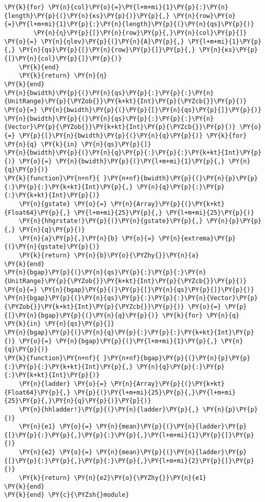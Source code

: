 \begin{Verbatim}[commandchars=\\\{\}]
    \PY{k}{for} \PY{n}{col}\PY{o}{=}\PY{l+m+mi}{1}\PY{p}{:}\PY{n}{length}\PY{p}{(}\PY{n}{κs}\PY{p}{)}\PY{p}{,} \PY{n}{row}\PY{o}{=}\PY{l+m+mi}{1}\PY{p}{:}\PY{n}{length}\PY{p}{(}\PY{n}{qs}\PY{p}{)}
        \PY{n}{η}\PY{p}{[}\PY{n}{row}\PY{p}{,}\PY{n}{col}\PY{p}{]} \PY{o}{=} \PY{n}{ηlev}\PY{p}{(}\PY{n}{A}\PY{p}{,} \PY{l+m+mi}{1}\PY{p}{,} \PY{n}{qs}\PY{p}{[}\PY{n}{row}\PY{p}{]}\PY{p}{,} \PY{n}{κs}\PY{p}{[}\PY{n}{col}\PY{p}{]}\PY{p}{)}
    \PY{k}{end}
    \PY{k}{return} \PY{n}{η}
\PY{k}{end}
\PY{n}{bwidth}\PY{p}{(}\PY{n}{qs}\PY{p}{:}\PY{p}{:}\PY{n}{UnitRange}\PY{p}{\PYZob{}}\PY{k+kt}{Int}\PY{p}{\PYZcb{}}\PY{p}{)} \PY{o}{=} \PY{n}{bwidth}\PY{p}{(}\PY{p}{[}\PY{n}{qs}\PY{p}{]}\PY{p}{)}
\PY{n}{bwidth}\PY{p}{(}\PY{n}{qs}\PY{p}{:}\PY{p}{:}\PY{n}{Vector}\PY{p}{\PYZob{}}\PY{k+kt}{Int}\PY{p}{\PYZcb{}}\PY{p}{)} \PY{o}{=} \PY{p}{[}\PY{n}{bwidth}\PY{p}{(}\PY{n}{q}\PY{p}{)} \PY{k}{for} \PY{n}{q} \PY{k}{in} \PY{n}{qs}\PY{p}{]}
\PY{n}{bwidth}\PY{p}{(}\PY{n}{q}\PY{p}{:}\PY{p}{:}\PY{k+kt}{Int}\PY{p}{)} \PY{o}{=} \PY{n}{bwidth}\PY{p}{(}\PY{l+m+mi}{1}\PY{p}{,} \PY{n}{q}\PY{p}{)}
\PY{k}{function}\PY{n+nf}{ }\PY{n+nf}{bwidth}\PY{p}{(}\PY{n}{p}\PY{p}{:}\PY{p}{:}\PY{k+kt}{Int}\PY{p}{,} \PY{n}{q}\PY{p}{:}\PY{p}{:}\PY{k+kt}{Int}\PY{p}{)}
    \PY{n}{gstate} \PY{o}{=} \PY{n}{Array}\PY{p}{(}\PY{k+kt}{Float64}\PY{p}{,} \PY{l+m+mi}{25}\PY{p}{,} \PY{l+m+mi}{25}\PY{p}{)}
    \PY{n}{hhgrstate!}\PY{p}{(}\PY{n}{gstate}\PY{p}{,} \PY{n}{p}\PY{p}{,} \PY{n}{q}\PY{p}{)}
    \PY{n}{a}\PY{p}{,}\PY{n}{b} \PY{o}{=} \PY{n}{extrema}\PY{p}{(}\PY{n}{gstate}\PY{p}{)}
    \PY{k}{return} \PY{n}{b}\PY{o}{\PYZhy{}}\PY{n}{a}
\PY{k}{end}
\PY{n}{bgap}\PY{p}{(}\PY{n}{qs}\PY{p}{:}\PY{p}{:}\PY{n}{UnitRange}\PY{p}{\PYZob{}}\PY{k+kt}{Int}\PY{p}{\PYZcb{}}\PY{p}{)} \PY{o}{=} \PY{n}{bgap}\PY{p}{(}\PY{p}{[}\PY{n}{qs}\PY{p}{]}\PY{p}{)}
\PY{n}{bgap}\PY{p}{(}\PY{n}{qs}\PY{p}{:}\PY{p}{:}\PY{n}{Vector}\PY{p}{\PYZob{}}\PY{k+kt}{Int}\PY{p}{\PYZcb{}}\PY{p}{)} \PY{o}{=} \PY{p}{[}\PY{n}{bgap}\PY{p}{(}\PY{n}{q}\PY{p}{)} \PY{k}{for} \PY{n}{q} \PY{k}{in} \PY{n}{qs}\PY{p}{]}
\PY{n}{bgap}\PY{p}{(}\PY{n}{q}\PY{p}{:}\PY{p}{:}\PY{k+kt}{Int}\PY{p}{)} \PY{o}{=} \PY{n}{bgap}\PY{p}{(}\PY{l+m+mi}{1}\PY{p}{,} \PY{n}{q}\PY{p}{)}
\PY{k}{function}\PY{n+nf}{ }\PY{n+nf}{bgap}\PY{p}{(}\PY{n}{p}\PY{p}{:}\PY{p}{:}\PY{k+kt}{Int}\PY{p}{,} \PY{n}{q}\PY{p}{:}\PY{p}{:}\PY{k+kt}{Int}\PY{p}{)}
    \PY{n}{ladder} \PY{o}{=} \PY{n}{Array}\PY{p}{(}\PY{k+kt}{Float64}\PY{p}{,} \PY{p}{(}\PY{l+m+mi}{25}\PY{p}{,}\PY{l+m+mi}{25}\PY{p}{,}\PY{n}{q}\PY{p}{)}\PY{p}{)}
    \PY{n}{hhladder!}\PY{p}{(}\PY{n}{ladder}\PY{p}{,} \PY{n}{p}\PY{p}{)}
    \PY{n}{e1} \PY{o}{=} \PY{n}{mean}\PY{p}{(}\PY{n}{ladder}\PY{p}{[}\PY{p}{:}\PY{p}{,}\PY{p}{:}\PY{p}{,}\PY{l+m+mi}{1}\PY{p}{]}\PY{p}{)}
    \PY{n}{e2} \PY{o}{=} \PY{n}{mean}\PY{p}{(}\PY{n}{ladder}\PY{p}{[}\PY{p}{:}\PY{p}{,}\PY{p}{:}\PY{p}{,}\PY{l+m+mi}{2}\PY{p}{]}\PY{p}{)}
    \PY{k}{return} \PY{n}{e2}\PY{o}{\PYZhy{}}\PY{n}{e1}
\PY{k}{end}
\PY{k}{end} \PY{c}{\PYZsh{}module}
\end{Verbatim}

